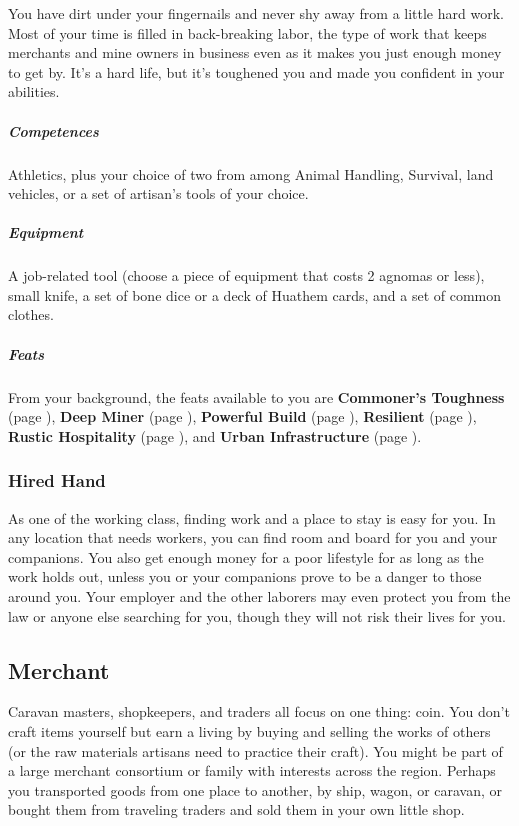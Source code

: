     You have dirt under your fingernails and never shy away from a little hard work.
    Most of your time is filled in back-breaking labor, the type of work that keeps merchants and mine owners in business even as it makes you just enough money to get by.
    It’s a hard life, but it’s toughened you and made you confident in your abilities.

    \subparagraph{Competences} Athletics, plus your choice of two from among Animal Handling, Survival, land vehicles, or a set of artisan's tools of your choice.

    \subparagraph{Equipment} A job-related tool (choose a piece of equipment that costs 2 agnomas or less), small knife, a set of bone dice or a deck of Huathem cards, and a set of common clothes.

    \subparagraph{Feats} From your background, the feats available to you are
    \textbf{Commoner's Toughness} (page \pageref{feat::commonerstoughness}),
    \textbf{Deep Miner} (page \pageref{feat::deepminer}),
    \textbf{Powerful Build} (page \pageref{feat::powerfulbuild}),
    \textbf{Resilient} (page \pageref{feat::resilient}),
    \textbf{Rustic Hospitality} (page \pageref{feat::rustichospitality}), and
    \textbf{Urban Infrastructure} (page \pageref{feat::urbaninfrastructure}).

    \subsubsection{Hired Hand}
        As one of the working class, finding work and a place to stay is easy for you.
        In any location that needs workers, you can find room and board for you and your companions.
        You also get enough money for a poor lifestyle for as long as the work holds out, unless you or your companions prove to be a danger to those around you.
        Your employer and the other laborers may even protect you from the law or anyone else searching for you, though they will not risk their lives for you.

\subsection*{Merchant} \label{ssec::merchant}
    Caravan masters, shopkeepers, and traders all focus on one thing: coin.
    You don't craft items yourself but earn a living by buying and selling the works of others (or the raw materials artisans need to practice their craft).
    You might be part of a large merchant consortium or family with interests across the region. Perhaps you transported goods from one place to another, by ship, wagon, or caravan, or bought them from traveling traders and sold them in your own little shop.


